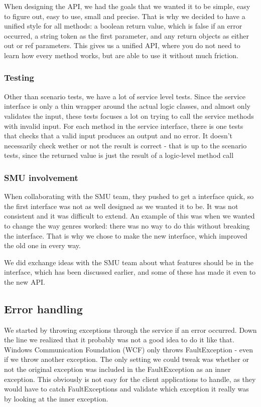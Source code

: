 When designing the API, we had the goals that we wanted it to be simple, easy to figure out, easy to use, small and precise. That is why we decided to have a unified style for all methods: a boolean return value, which is false if an error occurred, a string token as the first parameter, and any return objects as either out or ref parameters. This gives us a unified API, where you do not need to learn how every method works, but are able to use it without much friction.

\subsubsection{Testing}
Other than scenario tests, we have a lot of service level tests. Since the service interface is only a thin wrapper around the actual logic classes, and almost only validates the input, these tests focuses a lot on trying to call the service methods with invalid input. For each method in the service interface, there is one tests that checks that a valid input produces an output and no error. It doesn't necessarily check wether or not the result is correct - that is up to the scenario tests, since the returned value is just the result of a logic-level method call

\subsubsection{SMU involvement}
\label{Design_Service_Interface_SMU}
When collaborating with the SMU team, they pushed to get a interface quick, so the first interface was not as well designed as we wanted it to be. It was not consistent and it was difficult to extend. An example of this was when we wanted to change the way genres worked: there was no way to do this without breaking the interface. That is why we chose to make the new interface, which improved the old one in every way.

We did exchange ideas with the SMU team about what features should be in the interface, which has been discussed earlier, and some of these has made it even to the new API.

\subsection{Error handling}
\label{Implementation_Service_Error}

We started by throwing exceptions through the service if an error occurred. Down the line we realized that it probably was not a good idea to do it like that. Windows Communication Foundation (WCF) only throws FaultException - even if we throw another exception. The only setting we could tweak was whether or not the original exception was included in the FaultException as an inner exception. This obviously is not easy for the client applications to handle, as they would have to catch FaultExceptions and validate which exception it really was by looking at the inner exception.

